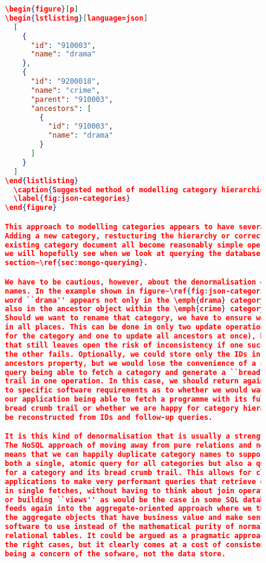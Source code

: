 \documentclass[11pt,a4paper]{article}
\begin{document}
\begin{figure}[p]
\begin{lstlisting}[language=json]
\begin{figure}[p]
\begin{lstlisting}[language=json]
  [
    {
      "id": "910003",
      "name": "drama"
    },
    {
      "id": "9200018",
      "name": "crime",
      "parent": "910003",
      "ancestors": [
        {
          "id": "910003",
          "name": "drama"
        }
      ]
    }
  ]
\end{listlisting}
  \caption{Suggested method of modelling category hierarchies in MongoDB}
  \label{fig:json-categories}
\end{figure}

This approach to modelling categories appears to have several benefits.
Adding a new category, restucturing the hierarchy or correcting an
existing category document all become reasonably simple operations, which
we will hopefully see when we look at querying the database in
section~\ref{sec:mongo-querying}.

We have to be cautious, however, about the denormalisation of category
names. In the example shown in figure~\ref{fig:json-categories}, the
word ``drama'' appears not only in the \emph{drama} category document, but
also in the ancestor object within the \emph{crime} category document.
Should we want to rename that category, we have to ensure we update it
in all places. This can be done in only two update operations (one
for the category and one to update all ancestors at once), but
that still leaves open the risk of inconsistency if one succeeds, but
the other fails. Optionally, we could store only the IDs in the
ancestors property, but we would lose the convenience of a single
query being able to fetch a category and generate a ``bread crumb''
trail in one operation. In this case, we should return again
to specific software requirements as to whether we would want
our application being able to fetch a programme with its full category
bread crumb trail or whether we are happy for category hierarchies to
be reconstructed from IDs and follow-up queries.

It is this kind of denormalisation that is usually a strength of MongoDB.
The NoSQL approach of moving away from pure relations and normal forms
means that we can happily duplicate category names to support
both a single, atomic query for all categories but also a query
for a category and its bread crumb trail. This allows for client
applications to make very performant queries that retrieve everything
in single fetches, without having to think about join operations
or building ``views'' as would be the case in some SQL databases. This
feeds again into the aggregate-oriented approach where we think about
the aggregate objects that have business value and make sense for our
software to use instead of the mathematical purity of normalised,
relational tables. It could be argued as a pragmatic approach for
the right cases, but it clearly comes at a cost of consistency now
being a concern of the sofware, not the data store.


\end{lstlisting}
\end{figure}
\end{document}
